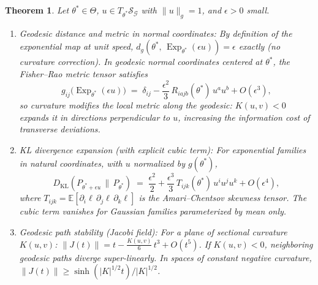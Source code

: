 \documentclass[a4paper,fleqn]{cas-dc}
\newtheorem{theorem}{Theorem}
\DeclareMathOperator{\Exp}{Exp}
\newcommand{\E}{\mathbb{E}}
\newcommand{\calS}{\mathcal{S}}
\newcommand{\calG}{\mathcal{G}}
\newcommand{\DKL}{D_{\mathrm{KL}}}
\begin{document}
\begin{theorem}%
  \label{thm:curvature_instability}
  Let $\theta^*\in\Theta$, $u\in T_{\theta^*}\calS_{\calG}$ with $\|u\|_g=1$,
  and $\epsilon>0$ small.
  \begin{enumerate}
    \item[(i)] \emph{Geodesic distance and metric in normal coordinates:}
          By definition of the exponential map at unit speed,
          $d_g(\theta^*,\,\Exp_{\theta^*}(\epsilon u)) = \epsilon$ \emph{exactly}
          (no curvature correction).
          In geodesic normal coordinates centered at $\theta^*$, the Fisher--Rao
          metric tensor satisfies
          \begin{equation}
            g_{ij}\!\bigl(\Exp_{\theta^*}(\epsilon u)\bigr)
            \;=\; \delta_{ij}
            - \frac{\epsilon^2}{3}\,R_{iajb}(\theta^*)\,u^a u^b
            + O(\epsilon^3),
            \label{eq:metric_normal_coords}
          \end{equation}
          so curvature modifies the local metric along the geodesic:
          $K(u,v)<0$ expands it in directions perpendicular to $u$,
          increasing the information cost of transverse deviations.
    \item[(ii)] \emph{KL divergence expansion (with explicit cubic term):}
          For exponential families in natural coordinates, with $u$ normalized by $g(\theta^*)$,
          \begin{equation}
            \DKL\!\left(P_{\theta^*+\epsilon u} \,\|\, P_{\theta^*}\right)
            \;=\;
            \frac{\epsilon^2}{2}
            +
            \frac{\epsilon^3}{3}\,
            T_{ijk}(\theta^*)\,u^i u^j u^k
            +
            O(\epsilon^4),
            \label{eq:kl_expansion_corrected}
          \end{equation}
          where $T_{ijk} = \E[\partial_i\ell\, \partial_j\ell\, \partial_k\ell]$
          is the Amari--Chentsov skewness tensor.  The cubic term vanishes
          for Gaussian families parameterized by mean only.
    \item[(iii)] \emph{Geodesic path stability (Jacobi field):}
          For a plane of sectional curvature $K(u,v)$:
          $\|J(t)\| = t - \frac{K(u,v)}{6}\,t^3 + O(t^5)$.
          If $K(u,v)<0$, neighboring geodesic paths diverge
          \emph{super-linearly}.  In spaces of constant negative curvature,
          $\|J(t)\| \geq \sinh(|K|^{1/2}t) / |K|^{1/2}$.
  \end{enumerate}
\end{theorem}
\end{document}

